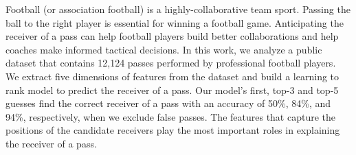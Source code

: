 Football (or association football) is a highly-collaborative team sport. 
Passing the ball to the right player is essential for winning a football game.
Anticipating the receiver of a pass can help football players build better collaborations and help coaches make informed tactical decisions.
In this work, we analyze a public dataset that contains 12,124 passes performed by professional football players.
We extract five dimensions of features from the dataset and build a learning to rank model to predict the receiver of a pass. 
Our model's first, top-3 and top-5 guesses find the correct receiver of a pass with an accuracy of 50\%, 84\%, and 94\%, respectively, when we exclude false passes.
The features that capture the positions of the candidate receivers play the most important roles in explaining the receiver of a pass.

